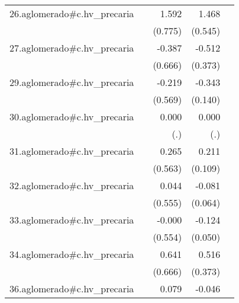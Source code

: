 {\begin{longtable}{l*{4}{D{.}{.}{-1}}}
\addlinespace
26.aglomerado#c.hv\_precaria&                     &       1.592\sym{*}  &       1.468\sym{**} &                     \\
            &                     &     (0.775)         &     (0.545)         &                     \\
\addlinespace
27.aglomerado#c.hv\_precaria&                     &      -0.387         &      -0.512         &                     \\
            &                     &     (0.666)         &     (0.373)         &                     \\
\addlinespace
29.aglomerado#c.hv\_precaria&                     &      -0.219         &      -0.343\sym{*}  &                     \\
            &                     &     (0.569)         &     (0.140)         &                     \\
\addlinespace
30.aglomerado#c.hv\_precaria&                     &       0.000         &       0.000         &                     \\
            &                     &         (.)         &         (.)         &                     \\
\addlinespace
31.aglomerado#c.hv\_precaria&                     &       0.265         &       0.211         &                     \\
            &                     &     (0.563)         &     (0.109)         &                     \\
\addlinespace
32.aglomerado#c.hv\_precaria&                     &       0.044         &      -0.081         &                     \\
            &                     &     (0.555)         &     (0.064)         &                     \\
\addlinespace
33.aglomerado#c.hv\_precaria&                     &      -0.000         &      -0.124\sym{*}  &                     \\
            &                     &     (0.554)         &     (0.050)         &                     \\
\addlinespace
34.aglomerado#c.hv\_precaria&                     &       0.641         &       0.516         &                     \\
            &                     &     (0.666)         &     (0.373)         &                     \\
\addlinespace
36.aglomerado#c.hv\_precaria&                     &       0.079         &      -0.046         &                     \\

\end{longtable}}
